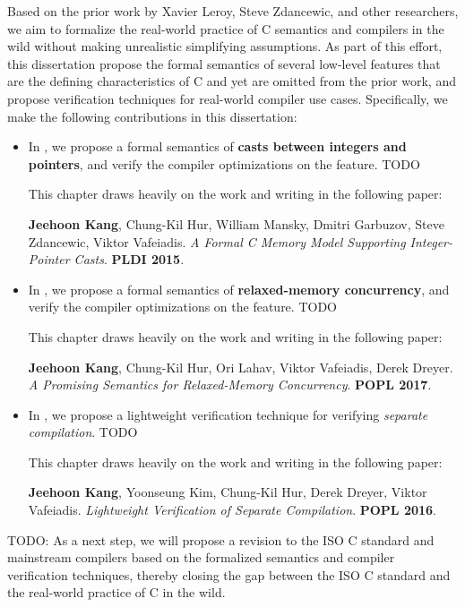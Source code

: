 Based on the prior work by Xavier Leroy, Steve Zdancewic, and other researchers, we aim to formalize
the real-world practice of C semantics and compilers in the wild without making unrealistic
simplifying assumptions.  As part of this effort, this dissertation propose the formal semantics of
several low-level features that are the defining characteristics of C and yet are omitted from the
prior work, and propose verification techniques for real-world compiler use cases.  Specifically, we
make the following contributions in this dissertation:

%
\begin{itemize}
\item In , we propose a formal semantics of \textbf{casts between integers and
    pointers}, and verify the compiler optimizations on the feature.  TODO

  This chapter draws heavily on the work and writing in the following paper:

  {\small \cite{intptrcast} \textbf{Jeehoon Kang}, Chung-Kil Hur, William Mansky, Dmitri Garbuzov,
    Steve Zdancewic, Viktor Vafeiadis.  \emph{A Formal C Memory Model Supporting Integer-Pointer
      Casts}.  \textbf{PLDI 2015}.}

\item In , we propose a formal semantics of \textbf{relaxed-memory
    concurrency}, and verify the compiler optimizations on the feature.  TODO

  This chapter draws heavily on the work and writing in the following paper:

  {\small \cite{promising} \textbf{Jeehoon Kang}, Chung-Kil Hur, Ori Lahav, Viktor Vafeiadis, Derek
    Dreyer.  \emph{A Promising Semantics for Relaxed-Memory Concurrency}.  \textbf{POPL 2017}.}

\item In , we propose a lightweight verification technique for verifying
  \emph{separate compilation}.  TODO

  This chapter draws heavily on the work and writing in the following paper:

  {\small \cite{sepcomp} \textbf{Jeehoon Kang}, Yoonseung Kim, Chung-Kil Hur, Derek Dreyer, Viktor
    Vafeiadis.  \emph{Lightweight Verification of Separate Compilation}.  \textbf{POPL 2016}.}
\end{itemize}

TODO: As a next step, we will propose a revision to the ISO C standard and mainstream compilers
based on the formalized semantics and compiler verification techniques, thereby closing the gap
between the ISO C standard and the real-world practice of C in the wild.

